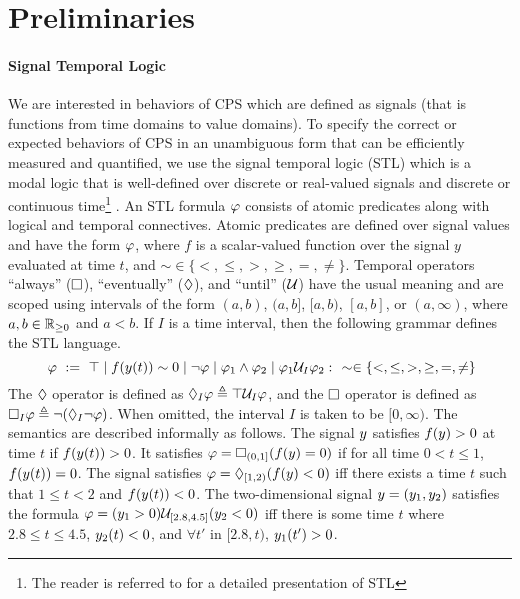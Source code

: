 \section{Preliminaries}\label{sec:prlim}
\paragraph{Signal Temporal Logic} 
 We are interested in behaviors of CPS which are defined as signals (that is functions from time domains to value domains). To specify the correct or expected behaviors of CPS in an unambiguous form that can be efficiently measured and quantified, we use the signal temporal logic (STL) which is a modal logic that is well-defined over discrete or real-valued signals and discrete or continuous time\footnote{The reader is referred to \cite{MalerN04} for a detailed presentation of STL} \cite{MalerN04}. An STL formula $\varphi$ consists of atomic predicates along with logical and temporal connectives.
Atomic predicates are defined over signal values and have the form $\varphi$, where $f$ is a scalar-valued function over the signal $y$ evaluated at time $t$, and $\sim \in \{ <,\leq, >, \geq, =, \neq \}$.
Temporal operators ``always'' ($\Box$), ``eventually'' ($\Diamond$), and ``until'' ($\mathcal{U}$) have the usual meaning and are scoped using intervals of the form $(a,b)$, $(a,b]$, $[a,b)$, $[a,b]$, or $(a,\infty)$, where 
$a,b\in \mathbb{R}_{\geq 0}$ and $a<b$. If $I$ is a time interval, then the following grammar defines the STL language.
\begin{equation}~\label{eqn:stl-gen}
\varphi ~ := ~ \top \; | \; f(y(t))\sim 0 \; | \; \neg \varphi \; | \;
\varphi_1 \wedge \varphi_2 \; | \; \varphi_1 \mathcal{U}_I \varphi_2:~~\sim \in \{ <,\leq,>,\geq,=,\neq \}
\end{equation}
The $\Diamond$ operator is defined as $\Diamond_I \varphi \triangleq \top \mathcal{U}_I \varphi$, and the $\Box$ operator is defined as $\Box_I \varphi \triangleq \neg (\Diamond _I \neg \varphi)$. When omitted, the interval $I$ is taken  to be $[0,\infty)$. The semantics are described informally as follows. The signal $y$ satisfies $f(y)> 0$ at time $t$ if $f(y(t))>0$. It satisfies $\varphi = \Box_{(0,1]}(f(y)=0)$ if for all time $0< t \leq 1$, $f(y(t))=0$. The signal satisfies $\varphi= \Diamond_{[1,2)}(f(y)<0)$ iff there exists a time $t$ such that $1\leq t < 2$ and $f(y(t))<0$. The two-dimensional signal $y=(y_1,y_2)$ satisfies the formula $\varphi=(y_1>0)\mathcal{U}_{[2.8,4.5]}(y_2<0)$ iff there is some time $t$ where $2.8 \leq t \leq 4.5$, $y_2(t)<0$, and $\forall t'$ in $[2.8,t)$, $y_1(t')>0$. 

